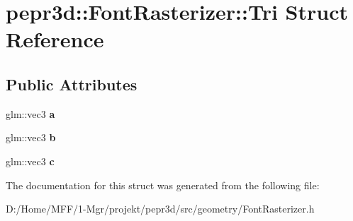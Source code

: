 \hypertarget{structpepr3d_1_1_font_rasterizer_1_1_tri}{}\section{pepr3d\+::Font\+Rasterizer\+::Tri Struct Reference}
\label{structpepr3d_1_1_font_rasterizer_1_1_tri}
\subsection*{Public Attributes}
\begin{DoxyCompactItemize}
\item 
\mbox{\label{structpepr3d_1_1_font_rasterizer_1_1_tri_a7dc030fc391253b493fd19a19c5df2e8}} 
glm\+::vec3 {\bfseries a}
\item 
\mbox{\label{structpepr3d_1_1_font_rasterizer_1_1_tri_aff84a1311ee97a572a5c2b40c625198f}} 
glm\+::vec3 {\bfseries b}
\item 
\mbox{\label{structpepr3d_1_1_font_rasterizer_1_1_tri_a606c3befadad2bb152038a0b5d26e182}} 
glm\+::vec3 {\bfseries c}
\end{DoxyCompactItemize}


The documentation for this struct was generated from the following file\+:\begin{DoxyCompactItemize}
\item 
D\+:/\+Home/\+M\+F\+F/1-\/\+Mgr/projekt/pepr3d/src/geometry/Font\+Rasterizer.\+h\end{DoxyCompactItemize}
